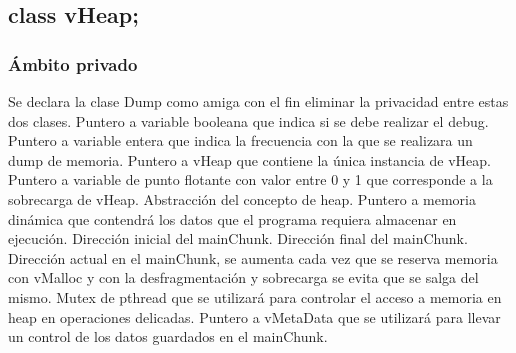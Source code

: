 \documentclass{vldb}
\begin{document}
\subsubsubsection{}
\subsubsubsubsection{}
\subsubsubsubsection{}

\subsubsubsection{}
\subsubsubsubsection{}
\subsubsubsubsection{}

\subsubsubsection{}
\subsubsubsubsection{}
\subsubsubsubsection{}

\subsubsubsection{}
\subsubsubsubsection{}
\subsubsubsubsection{}

\subsubsubsection{}
\subsubsubsubsection{}
\subsubsubsubsection{}

\subsubsubsection{}
\subsubsubsubsection{}
\subsubsubsubsection{}

\subsubsubsection{}
\subsubsubsubsection{}
\subsubsubsubsection{}

\subsubsubsection{}
\subsubsubsubsection{}
\subsubsubsubsection{}

\subsubsubsection{}
\subsubsubsubsection{}
\subsubsubsubsection{}

\subsubsubsection{}
\subsubsubsubsection{}
\subsubsubsubsection{}

\subsubsubsection{}

\subsubsubsection{}

\subsubsubsection{}

\subsubsubsection{}

\subsubsubsection{}

\subsubsubsection{}

\subsubsubsection{}


\subsection{class vHeap;}

\subsubsection{Ámbito privado}

Se declara la clase Dump como amiga con el fin eliminar la privacidad entre estas dos clases.
Puntero a variable booleana que indica si se debe realizar el debug.
Puntero a variable entera que indica la frecuencia con la que se realizara un dump de memoria.
Puntero a vHeap que contiene la única instancia de vHeap.
Puntero a variable de punto flotante con valor entre 0 y 1 que corresponde a la sobrecarga de vHeap.
Abstracción del concepto de heap. Puntero a memoria dinámica que contendrá los datos que el programa requiera almacenar en ejecución.
Dirección inicial del mainChunk.
Dirección final del mainChunk.
Dirección actual en el mainChunk, se aumenta cada vez que se reserva memoria con vMalloc y con la desfragmentación y sobrecarga se evita que se salga del mismo.
Mutex de pthread que se utilizará para controlar el acceso a memoria en heap en operaciones delicadas.
Puntero a vMetaData que se utilizará para llevar un control de los datos guardados en el mainChunk.
\end{document}

